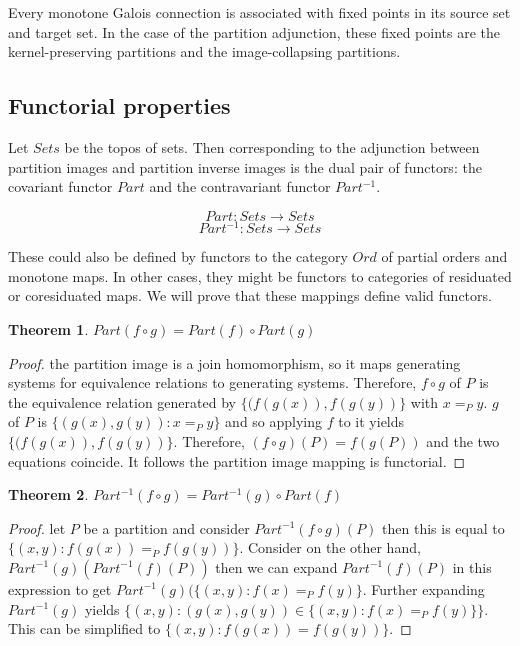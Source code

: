 \documentclass[a4paper,11pt, notitlepage]{report}
\theoremstyle{definition}
\newtheorem{theorem}{Theorem}[section]
\begin{document}
Every monotone Galois connection is associated with fixed points in its source set and target set. In the case of the partition adjunction, these fixed points are the kernel-preserving partitions and the image-collapsing partitions.

\subsection{Functorial properties}
Let $Sets$ be the topos of sets. Then corresponding to the adjunction between partition images and partition inverse images is the dual pair of functors: the covariant functor $Part$ and the contravariant functor $Part^{-1}$.

\[ Part : Sets \to Sets \]
\[ Part^{-1} : Sets \to Sets \]

These could also be defined by functors to the category $Ord$ of partial orders and monotone maps. In other cases, they might be functors to categories of residuated or coresiduated maps. We will prove that these mappings define valid functors.

\begin{theorem}
$Part(f \circ g) = Part(f) \circ Part(g)$
\end{theorem}

\begin{proof}
the partition image is a join homomorphism, so it maps generating systems for equivalence relations to generating systems. Therefore, $f \circ g$ of $P$ is the equivalence relation generated by $\{(f(g(x)),f(g(y))\}$ with $x =_P y$. $g$ of $P$ is $\{(g(x),g(y)) : x =_P y \}$ and so applying $f$ to it yields $\{(f(g(x)),f(g(y))\}$. Therefore, $(f \circ g)(P) = f(g(P))$ and the two equations coincide. It follows the partition image mapping is functorial.
\end{proof}

\begin{theorem}
$Part^{-1}(f \circ g) = Part^{-1}(g) \circ Part(f)$
\end{theorem}

\begin{proof}
let $P$ be a partition and consider $Part^{-1}(f \circ g)(P)$ then this is equal to $\{(x,y) : f(g(x)) =_P f(g(y))\}$. Consider on the other hand, $Part^{-1}(g)(Part^{-1}(f)(P))$ then we can expand $Part^{-1}(f)(P)$ in this expression to get $Part^{-1}(g)(\{(x,y) : f(x) =_P f(y)\}$. Further expanding $Part^{-1}(g)$ yields $\{(x,y) : (g(x),g(y)) \in \{(x,y) : f(x) =_P f(y)\}\}$. This can be simplified to $\{(x,y) : f(g(x)) = f(g(y))\}$.
\end{proof}
\end{document}
